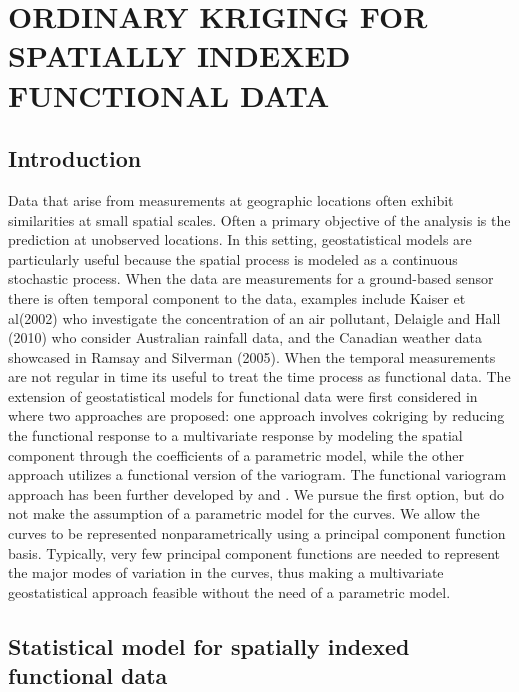 

\chapter{ORDINARY KRIGING FOR SPATIALLY INDEXED FUNCTIONAL DATA} 
\label{ch:functional kriging}

\section{Introduction} 

\label{sec:introduction}

Data that arise from measurements at geographic locations often exhibit similarities at small spatial scales. Often a primary objective of the analysis is the prediction at unobserved locations. In this setting, geostatistical models are particularly useful because the spatial process is modeled as a continuous stochastic process. When the data are measurements for a ground-based sensor there is often temporal component to the data, examples include Kaiser et al(2002) who investigate the concentration of an air pollutant, Delaigle and Hall (2010) who consider Australian rainfall data, and the Canadian weather data showcased in Ramsay and Silverman (2005). When the temporal measurements are not regular in time its useful to treat the time process as functional data. The extension of geostatistical models for functional data were first considered in \cite{Goulard:1993} where two approaches are proposed: one approach involves cokriging by reducing the functional response to a multivariate response by modeling the spatial component through the coefficients of a parametric model, while the other approach utilizes a functional version of the variogram. The functional variogram approach has been further developed by \cite{Giraldo:2010jx} and \cite{Nerini:2010ba}. We pursue the first option, but do not make the assumption of a parametric model for the curves. We allow the curves to be represented nonparametrically using a principal component function basis. Typically, very few principal component functions are needed to represent the major modes of variation in the curves, thus making a multivariate geostatistical approach feasible without the need of a parametric model. 


\section{Statistical model for spatially indexed functional data} 


